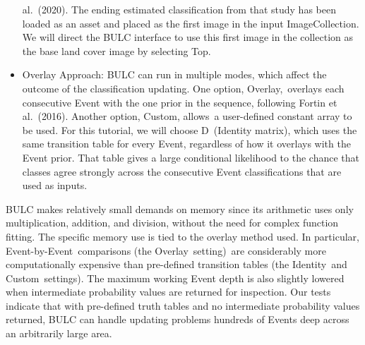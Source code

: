 \documentclass[
  letterpaper,
  DIV=11,
  numbers=noendperiod]{scrreprt}
\begin{document}
\begin{itemize}
  al.~(2020). The ending estimated classification from that study has
  been loaded as an asset and placed as the first image in the input
  ImageCollection. We will direct the BULC interface to use this first
  image in the collection as the base land cover image by selecting Top.
\item
  Overlay Approach: BULC can run in multiple modes, which affect the
  outcome of the classification updating. One option, Overlay,~overlays
  each consecutive Event with the one prior in the sequence, following
  Fortin et al.~(2016). Another option, Custom, allows~a user-defined
  constant array to be used. For this tutorial, we will choose
  D~(Identity matrix), which uses the same transition table for every
  Event, regardless of how it overlays with the Event prior. That table
  gives a large conditional likelihood to the chance that classes agree
  strongly across the consecutive Event classifications that are used as
  inputs.
\end{itemize}

BULC makes relatively small demands on memory since its arithmetic uses
only multiplication, addition, and division, without the need for
complex function fitting. The specific memory use is tied to the overlay
method used. In particular, Event-by-Event~comparisons (the
Overlay~setting)~are considerably more computationally expensive than
pre-defined transition tables (the Identity~and Custom~settings). The
maximum working Event depth is also slightly lowered when intermediate
probability values are returned for inspection. Our tests indicate that
with pre-defined truth tables and no intermediate probability values
returned, BULC can handle updating problems hundreds of Events deep
across an arbitrarily large area.
\end{document}
